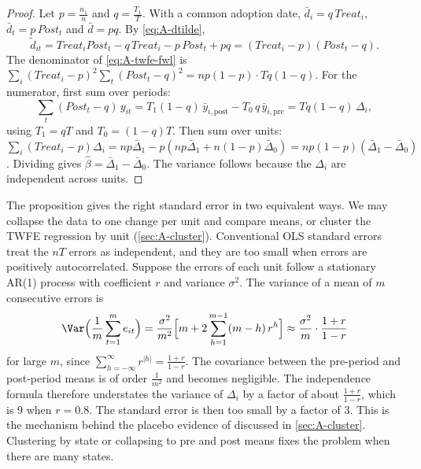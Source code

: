 \begin{proof}
Let $p=\frac{n_1}{n}$ and $q=\frac{T_1}{T}$. With a common adoption date, $\bar d_i=q\,\mathit{Treat}_i$,
$\bar d_t=p\,\mathit{Post}_t$ and $\bar d=pq$. By \eqref{eq:A-dtilde},
\begin{equation*}
\tilde d_{it}=\mathit{Treat}_i\mathit{Post}_t-q\,\mathit{Treat}_i-p\,\mathit{Post}_t+pq=(\mathit{Treat}_i-p)(\mathit{Post}_t-q).
\end{equation*}
The denominator of \eqref{eq:A-twfe-fwl} is $\sum_i(\mathit{Treat}_i-p)^2\sum_t(\mathit{Post}_t-q)^2=np(1-p)\cdot Tq(1-q)$.
For the numerator, first sum over periods:
\begin{equation*}
\sum_t(\mathit{Post}_t-q)\,y_{it}=T_1(1-q)\,\bar y_{i,\mathrm{post}}-T_0\,q\,\bar y_{i,\mathrm{pre}}=Tq(1-q)\,\Delta_i,
\end{equation*}
using $T_1=qT$ and $T_0=(1-q)T$. Then sum over units:
$\sum_i(\mathit{Treat}_i-p)\Delta_i=np\bar\Delta_1-p(np\bar\Delta_1+n(1-p)\bar\Delta_0)=np(1-p)(\bar\Delta_1-\bar\Delta_0)$.
Dividing gives $\hat\beta=\bar\Delta_1-\bar\Delta_0$. The variance follows because the $\Delta_i$ are independent
across units.
\end{proof}

The proposition gives the right standard error in two equivalent ways. We may collapse the data to one change per
unit and compare means, or cluster the TWFE regression by unit (\cref{sec:A-cluster}). Conventional OLS standard errors
treat the $nT$ errors as independent, and they are too small when errors are positively autocorrelated. Suppose the
errors of each unit follow a stationary AR(1) process with coefficient $r$ and variance $\sigma^2$. The variance of a
mean of $m$ consecutive errors is
\begin{equation*}
\Var\Big(\frac{1}{m}\sum_{t=1}^{m}e_{it}\Big)=\frac{\sigma^2}{m^2}\Big[m+2\sum_{h=1}^{m-1}(m-h)\,r^h\Big]
\approx\frac{\sigma^2}{m}\cdot\frac{1+r}{1-r}
\end{equation*}
for large $m$, since $\sum_{h=-\infty}^{\infty}r^{|h|}=\frac{1+r}{1-r}$. The covariance between the pre-period and
post-period means is of order $\frac{1}{m^2}$ and becomes negligible. The independence formula therefore understates
the variance of $\Delta_i$ by a factor of about $\frac{1+r}{1-r}$, which is 9 when $r=0.8$. The standard error is
then too small by a factor of 3. This is the mechanism behind the placebo evidence of
\citet{BertrandDufloMullainathan2004} discussed in \cref{sec:A-cluster}. Clustering by state or collapsing to pre and
post means fixes the problem when there are many states.

